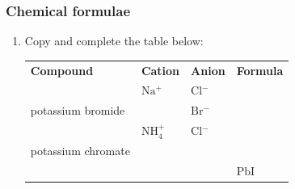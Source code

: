             \subsubsection{  Chemical formulae
        }
            \nopagebreak
        \label{m38689*id145052}\begin{enumerate}[noitemsep, label=\textbf{\arabic*}. ] 
            \label{m38689*uid100}\item 
Copy and complete the table below:
          \begin{table}[H]
        \begin{center}
      \label{m38689*id145067}
    \noindent
      \tablelasttail{}
      \begin{xtabular}[t]{|l|l|l|l|}\hline
        \textbf{Compound} &
        \textbf{Cation} &
        \textbf{Anion} &
        \textbf{Formula}%
     \tabularnewline{}
         &
        $\mathrm{Na}{}^{+}$ &
        $\mathrm{Cl}{}^{-}$ &
     \tabularnewline{}
        potassium bromide &
         &
        $\mathrm{Br}{}^{-}$ &
     \tabularnewline{}
         &
        $\mathrm{NH}_{4}^{+}$ &
        $\mathrm{Cl}{}^{-}$ &
     \tabularnewline{}
        potassium chromate &
         &
         &
     \tabularnewline{}
         &
         &
         &
        $\mathrm{PbI}$%
     \tabularnewline{}

\end{xtabular}
\end{center}
\end{table}
\end{enumerate}
